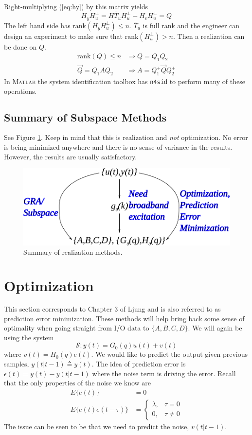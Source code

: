 Right-multiplying (\ref{eq:hy}) by this matrix yields
$$H_yH_u^\perp = H\overline{T}_uH_u^\perp + H_vH_u^\perp = Q$$
The left hand side has $\text{rank}(H_yH_u^\perp)\leq n$. $\overline{T}_u$ is full rank and the engineer can design an experiment to make sure that $\text{rank}(H_u^\perp)>n$. Then a realization can be done on $Q$.
\begin{align*}
\text{rank}(Q) \leq n &\Rightarrow Q=Q_1Q_2 \\
\vec{Q} = Q_1AQ_2 &\Rightarrow A=Q_1^+\vec{Q}Q_2^+
\end{align*}
In \textsc{Matlab} the system identification toolbox has \texttt{n4sid} to perform many of these operations.

\subsection{Summary of Subspace Methods}
See Figure \ref{fig:11realization}. Keep in mind that this is realization and \textit{not} optimization. No error is being minimized anywhere and there is no sense of variance in the results. However, the results are usually satisfactory.

\begin{figure}[ht!]
	\centering
	\includegraphics[width=.6\textwidth]{images/11realization}
	\caption{Summary of realization methods.}
	\label{fig:11realization}
\end{figure}

\section{Optimization}
This section corresponds to Chapter 3 of Ljung and is also referred to as prediction error minimization. These methods will help bring back some sense of optimality when going straight from I/O data to $\{A,B,C,D\}$. We will again be using the system
$$\mathcal{S}: y(t) = G_0(q)u(t)+v(t)$$
where $v(t) = H_0(q)e(t)$. We would like to predict the output given previous samples, $y(t|t-1)\triangleq y(t)$. The idea of prediction error is $\epsilon(t)=y(t)-y(t|t-1)$ where the noise term is driving the error. Recall that the only properties of the noise we know are
\begin{align*}
E\{e(t)\} &= 0 \\
E\{e(t)e(t-\tau)\} &= \begin{cases} \lambda, & \tau=0 \\ 0, & \tau\neq0 \end{cases}
\end{align*}
The issue can be seen to be that we need to predict the noise, $v(t|t-1)$.


